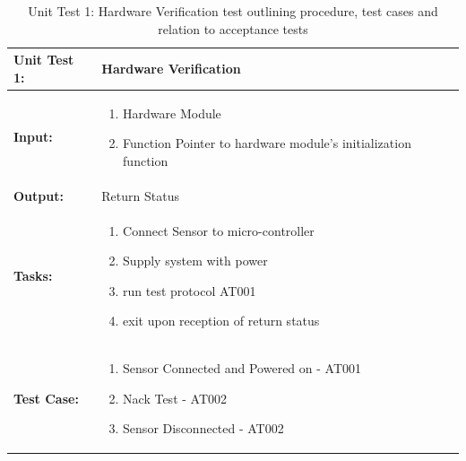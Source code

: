\begin{table}[H]
    \centering
    \caption{Unit Test 1: Hardware Verification  test outlining procedure, test cases and relation to acceptance tests}
    \begin{tabular}{|m{}|m{}|}
    \hline
       \textbf{Unit Test 1: }  &  Hardware Verification \\
       \hline
        \textbf{Input: } &  \begin{enumerate}
            \vspace{1mm}
            \item Hardware Module
            \item Function Pointer to hardware module's initialization function
        \end{enumerate}\\
        \hline
        \textbf{Output: } & Return Status\\
        \hline
        \textbf{Tasks: } & \begin{enumerate}
        \vspace{1mm}
            \item Connect Sensor to micro-controller 
            \item Supply system with power
            \item run test protocol AT001
            \item exit upon reception of return status
        \end{enumerate}\\
        \hline
        \textbf{Test Case: } & \begin{enumerate}
            \vspace{1mm}
            \item Sensor Connected and Powered on - AT001
            \item Nack Test - AT002
            \item Sensor Disconnected - AT002
        \end{enumerate}\\
        \hline

    \end{tabular}

    \label{tab:UT001}
\end{table}


